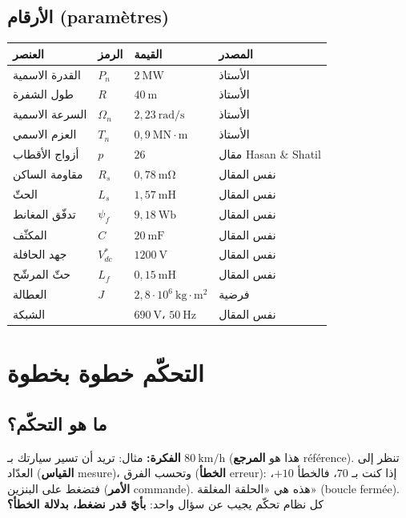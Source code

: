 \documentclass[11pt,a4paper]{article}
\newcommand{\fr}[1]{\textfrench{#1}}
\newcommand{\Fikra}{\textbf{الفكرة: }}
\begin{document}
\subsection{الأرقام (\fr{paramètres})}
\begin{center}
\begin{tabular}{llll}
\toprule
العنصر & الرمز & القيمة & المصدر\\
\midrule
القدرة الاسمية & $P_n$ & $2\ \mathrm{MW}$ & الأستاذ\\
طول الشفرة & $R$ & $40\ \mathrm{m}$ & الأستاذ\\
السرعة الاسمية & $\Omega_n$ & $2{,}23\ \mathrm{rad/s}$ & الأستاذ\\
العزم الاسمي & $T_n$ & $0{,}9\ \mathrm{MN\cdot m}$ & الأستاذ\\
أزواج الأقطاب & $p$ & $26$ & مقال \fr{Hasan \& Shatil}\\
مقاومة الساكن & $R_s$ & $0{,}78\ \mathrm{m\Omega}$ & نفس المقال\\
الحثّ & $L_s$ & $1{,}57\ \mathrm{mH}$ & نفس المقال\\
تدفّق المغانط & $\psi_f$ & $9{,}18\ \mathrm{Wb}$ & نفس المقال\\
المكثّف & $C$ & $20\ \mathrm{mF}$ & نفس المقال\\
جهد الحافلة & $V_{dc}^*$ & $1200\ \mathrm{V}$ & نفس المقال\\
حثّ المرشّح & $L_f$ & $0{,}15\ \mathrm{mH}$ & نفس المقال\\
العطالة & $J$ & $2{,}8\cdot10^6\ \mathrm{kg\cdot m^2}$ & فرضية\\
الشبكة & & $690\ \mathrm{V}$، $50\ \mathrm{Hz}$ & نفس المقال\\
\bottomrule
\end{tabular}
\end{center}

\section{التحكّم خطوة بخطوة}

\subsection{ما هو التحكّم؟}
\begin{fikra}
\Fikra
مثال: تريد أن تسير سيارتك بـ $80\ \mathrm{km/h}$ (هذا هو \textbf{المرجع} \fr{référence}). تنظر إلى العدّاد
(\textbf{القياس} \fr{mesure})، وتحسب الفرق (\textbf{الخطأ} \fr{erreur}): إذا كنت بـ $70$، فالخطأ $+10$،
فتضغط على البنزين (\textbf{الأمر} \fr{commande}). هذه هي «الحلقة المغلقة» (\fr{boucle fermée}).
كل نظام تحكّم يجيب عن سؤال واحد: \textbf{بأيّ قدر نضغط، بدلالة الخطأ؟}
\end{fikra}
\end{document}
